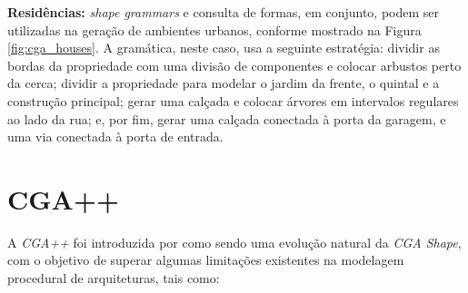 \newpage

\textbf{Residências:} \textit{shape grammars} e consulta de formas, em conjunto, podem ser utilizadas na geração de ambientes urbanos, conforme mostrado na Figura \ref{fig:cga_houses}. A gramática, neste caso, usa a seguinte estratégia: dividir as bordas da propriedade com uma divisão de componentes e colocar arbustos perto da cerca; dividir a propriedade para modelar o jardim da frente, o quintal e a construção principal; gerar uma calçada e colocar árvores em intervalos regulares ao lado da rua; e, por fim, gerar uma calçada conectada à porta da garagem, e uma via conectada à porta de entrada.

\begin{figure}[h!]
	\centering
	\captionsetup{width=15cm}
	{}	
\end{figure}

\section{CGA++}
\label{sec:cga++}

A \textit{CGA++} foi introduzida por  como sendo uma evolução natural da \textit{CGA Shape}, com o objetivo de superar algumas limitações existentes na modelagem procedural de arquiteturas, tais como:

\vspace{0.5cm}

